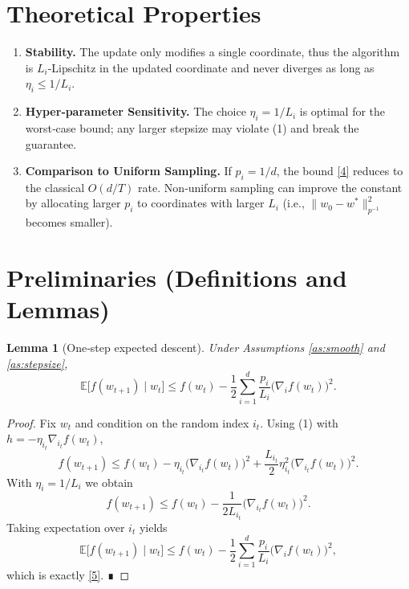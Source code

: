 \documentclass{article}
\newtheorem{lemma}{Lemma}
\newcommand{\E}{\mathbb{E}}
\begin{document}
\section*{Theoretical Properties}
\begin{enumerate}[label=\arabic*.]
\item \textbf{Stability.} The update only modifies a single coordinate, thus the algorithm is $L_i$‑Lipschitz in the updated coordinate and never diverges as long as $\eta_i\le 1/L_i$.
\item \textbf{Hyper‑parameter Sensitivity.} The choice $\eta_i=1/L_i$ is optimal for the worst‑case bound; any larger stepsize may violate (1) and break the guarantee.
\item \textbf{Comparison to Uniform Sampling.} If $p_i=1/d$, the bound \eqref{4} reduces to the classical $O(d/T)$ rate. Non‑uniform sampling can improve the constant by allocating larger $p_i$ to coordinates with larger $L_i$ (i.e., \(\|w_0-w^{*}\|_{p^{-1}}^{2}\) becomes smaller).
\end{enumerate}

\section*{Preliminaries (Definitions and Lemmas)}
\begin{lemma}[One‑step expected descent]\label{lem:onestep}
Under Assumptions \ref{as:smooth} and \ref{as:stepsize},
\[
\E\!\bigl[f(w_{t+1})\mid w_t\bigr]
\le f(w_t)-\frac{1}{2}\sum_{i=1}^{d}\frac{p_i}{L_i}\bigl(\nabla_i f(w_t)\bigr)^{2}.
\tag{5}
\]
\end{lemma}
\begin{proof}
Fix $w_t$ and condition on the random index $i_t$. Using (1) with $h=-\eta_{i_t}\nabla_{i_t}f(w_t)$,
\[
f(w_{t+1})\le f(w_t)-\eta_{i_t}\bigl(\nabla_{i_t}f(w_t)\bigr)^{2}
+\frac{L_{i_t}}{2}\eta_{i_t}^{2}\bigl(\nabla_{i_t}f(w_t)\bigr)^{2}.
\]
With $\eta_{i}=1/L_i$ we obtain
\[
f(w_{t+1})\le f(w_t)-\frac{1}{2L_{i_t}}\bigl(\nabla_{i_t}f(w_t)\bigr)^{2}.
\tag{Step 1}
\]
Taking expectation over $i_t$ yields
\[
\E\!\bigl[f(w_{t+1})\mid w_t\bigr]
\le f(w_t)-\frac{1}{2}\sum_{i=1}^{d}\frac{p_i}{L_i}\bigl(\nabla_i f(w_t)\bigr)^{2},
\]
which is exactly \eqref{5}.  ∎
\end{proof}
\end{document}
